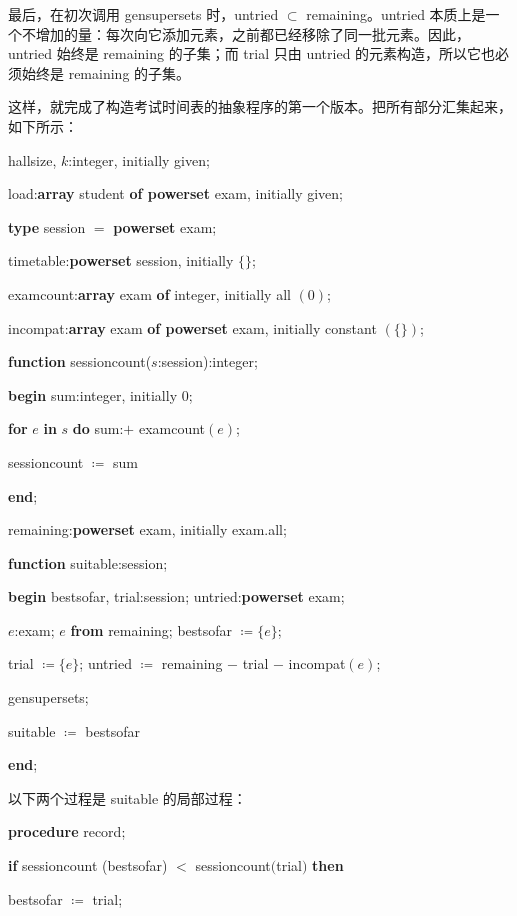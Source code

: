 \documentclass[twoside,11pt,fontset=none]{ctexbook}
\begin{document}
最后，在初次调用 gensupersets 时，untried $\subset$ remaining。untried 本质上是一个不增加的量：每次向它添加元素，之前都已经移除了同一批元素。因此，untried 始终是 remaining 的子集；而 trial 只由 untried 的元素构造，所以它也必须始终是 remaining 的子集。

这样，就完成了构造考试时间表的抽象程序的第一个版本。把所有部分汇集起来，如下所示：

hallsize, $k$:integer, initially given;

load:\textbf{array} student \textbf{of powerset} exam, initially given;

\textbf{type} session $=$ \textbf{powerset} exam;

timetable:\textbf{powerset} session, initially $\{\}$;

examcount:\textbf{array} exam \textbf{of} integer, initially all $(0)$;

incompat:\textbf{array} exam \textbf{of powerset} exam, initially constant $(\{\})$;

\textbf{function} sessioncount($s$:session):integer;

\quad \textbf{begin} sum:integer, initially 0;

\quad \quad \textbf{for} $e$ \textbf{in} $s$ \textbf{do} sum:$+$ examcount$(e)$;

\quad \quad sessioncount $\coloneq$ sum

\quad \textbf{end};

\quad remaining:\textbf{powerset} exam, initially exam.all;

\textbf{function} suitable:session;

\quad \textbf{begin} bestsofar, trial:session; untried:\textbf{powerset} exam;

\quad \quad $e$:exam; $e$ \textbf{from} remaining; bestsofar $\coloneq \{e\}$;

\quad \quad trial $\coloneq \{e\}$; untried $\coloneq$ remaining $-$ trial $-$ incompat$(e)$;

\quad \quad gensupersets;

\quad \quad suitable $\coloneq$ bestsofar

\quad \textbf{end};

\noindent
以下两个过程是 suitable 的局部过程：

\quad \textbf{procedure} record;

\quad \quad \textbf{if} sessioncount (bestsofar) $<$ sessioncount$($trial$)$ \textbf{then} 

\quad \quad \quad bestsofar $\coloneq$ trial;
\end{document}
